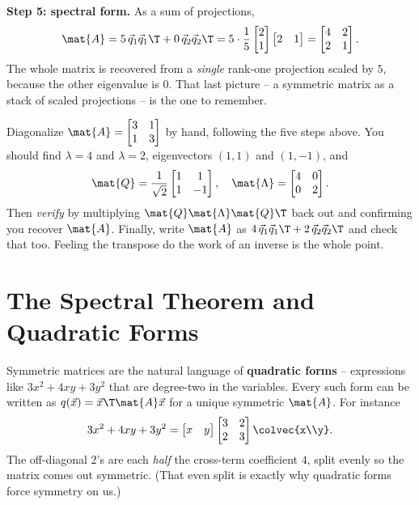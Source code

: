 \begin{example}
\textbf{Step 5: spectral form.} As a sum of projections,
\[
  \mat{A} = 5\,\vec{q}_1\vec{q}_1\T + 0\,\vec{q}_2\vec{q}_2\T
  = 5\cdot\frac15\begin{bmatrix}2\\1\end{bmatrix}\begin{bmatrix}2&1\end{bmatrix}
  = \begin{bmatrix}4&2\\2&1\end{bmatrix}.
\]
The whole matrix is recovered from a \emph{single} rank-one projection scaled by
$5$, because the other eigenvalue is $0$. That last picture -- a symmetric matrix
as a stack of scaled projections -- is the one to remember.
\end{example}

\begin{labbox}
Diagonalize $\mat{A}=\begin{bmatrix}3&1\\1&3\end{bmatrix}$ by hand, following the
five steps above. You should find $\lambda = 4$ and $\lambda = 2$, eigenvectors
$(1,1)$ and $(1,-1)$, and
\[
  \mat{Q}=\frac{1}{\sqrt2}\begin{bmatrix}1&1\\1&-1\end{bmatrix},\quad
  \mat{\Lambda}=\begin{bmatrix}4&0\\0&2\end{bmatrix}.
\]
Then \emph{verify} by multiplying $\mat{Q}\mat{\Lambda}\mat{Q}\T$ back out and
confirming you recover $\mat{A}$. Finally, write $\mat{A}$ as
$4\,\vec{q}_1\vec{q}_1\T + 2\,\vec{q}_2\vec{q}_2\T$ and check that too. Feeling the
transpose do the work of an inverse is the whole point.
\end{labbox}

\section{The Spectral Theorem and Quadratic Forms}
\label{ch26:quadratic-forms}

Symmetric matrices are the natural language of \textbf{quadratic forms} --
expressions like $3x^2 + 4xy + 3y^2$ that are degree-two in the variables. Every
such form can be written as $q(\vec{x}) = \vec{x}\T\mat{A}\vec{x}$ for a unique
symmetric $\mat{A}$. For instance
\[
  3x^2 + 4xy + 3y^2
  = \begin{bmatrix}x&y\end{bmatrix}\begin{bmatrix}3&2\\2&3\end{bmatrix}\colvec{x\\y}.
\]
The off-diagonal $2$'s are each \emph{half} the cross-term coefficient $4$, split
evenly so the matrix comes out symmetric. (That even split is exactly why
quadratic forms force symmetry on us.)

